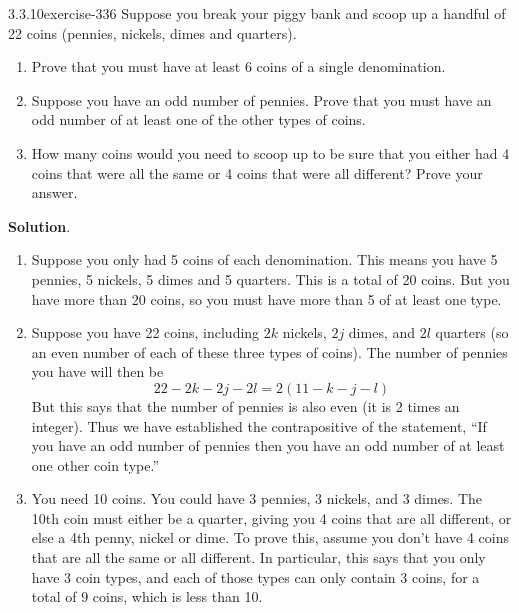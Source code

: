 \documentclass[twoside,11pt,]{book}
\numberwithin{equation}{chapter}
\begin{document}
\begin{divisionsolution}{3.3.10}{}{exercise-336}%
\hypertarget{p-4297}{}%
Suppose you break your piggy bank and scoop up a handful of 22 coins (pennies, nickels, dimes and quarters).\leavevmode%
\begin{enumerate}[label=(\alph*)]
\item\hypertarget{li-2192}{}\hypertarget{p-4298}{}%
Prove that you must have at least 6 coins of a single denomination.%
\item\hypertarget{li-2193}{}\hypertarget{p-4299}{}%
Suppose you have an odd number of pennies. Prove that you must have an odd number of at least one of the other types of coins.%
\item\hypertarget{li-2194}{}\hypertarget{p-4300}{}%
How many coins would you need to scoop up to be sure that you either had 4 coins that were all the same or 4 coins that were all different? Prove your answer.%
\end{enumerate}
%
\par\smallskip%
\noindent\textbf{Solution}.\quad%
\hypertarget{p-4301}{}%
\leavevmode%
\begin{enumerate}[label=(\alph*)]
\item\hypertarget{li-2195}{}\hypertarget{p-4302}{}%
Suppose you only had 5 coins of each denomination. This means you have 5 pennies, 5 nickels, 5 dimes and 5 quarters. This is a total of 20 coins. But you have more than 20 coins, so you must have more than 5 of at least one type.%
\item\hypertarget{li-2196}{}\hypertarget{p-4303}{}%
Suppose you have 22 coins, including \(2k\) nickels, \(2j\) dimes, and \(2l\) quarters (so an even number of each of these three types of coins). The number of pennies you have will then be%
\begin{equation*}
22 - 2k - 2j - 2l = 2(11-k-j-l)
\end{equation*}
But this says that the number of pennies is also even (it is 2 times an integer). Thus we have established the contrapositive of the statement, ``If you have an odd number of pennies then you have an odd number of at least one other coin type.''%
\item\hypertarget{li-2197}{}\hypertarget{p-4304}{}%
You need 10 coins. You could have 3 pennies, 3 nickels, and 3 dimes. The 10th coin must either be a quarter, giving you 4 coins that are all different, or else a 4th penny, nickel or dime. To prove this, assume you don't have 4 coins that are all the same or all different. In particular, this says that you only have 3 coin types, and each of those types can only contain 3 coins, for a total of 9 coins, which is less than 10.%
\end{enumerate}
%
\end{divisionsolution}%
\end{document}
